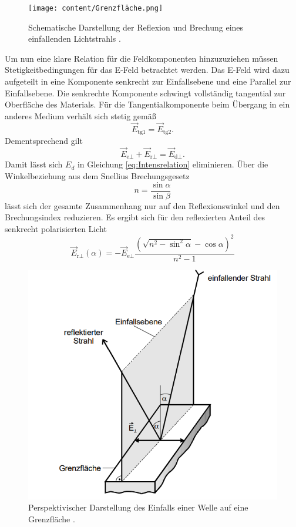 \begin{figure}[H]
    \centering
    \texttt{[image: content/Grenzfläche.png]}
    \caption{Schematische Darstellung der Reflexion und Brechung eines einfallenden Lichtstrahls \cite{sample}.}
    \label{fig:Grenz}
\end{figure}
Um nun eine klare Relation für die Feldkomponenten hinzuzuziehen müssen Stetigkeitbedingungen 
für das E-Feld betrachtet werden. Das E-Feld wird dazu aufgeteilt in eine Komponente senkrecht zur Einfallsebene und eine Parallel zur 
Einfallsebene. Die senkrechte Komponente schwingt vollständig tangential zur Oberfläche des Materials.
Für die Tangentialkomponente beim Übergang in ein anderes Medium verhält sich stetig gemäß
\begin{equation*}
    \vec{E}_\text{tg1}=\vec{E}_\text{tg2}.
\end{equation*}
Dementsprechend gilt
\begin{equation}
    \vec{E}_{\text{e}\perp}+ \vec{E}_{\text{r}\perp}= \vec{E}_{\text{d}\perp}.
    \label{eq:EsenkStet}
\end{equation}
Damit lässt sich $E_d$ in Gleichung \eqref{eq:Intensrelation} eliminieren. Über die Winkelbeziehung aus dem Snellius
Brechungsgesetz
\begin{equation}
    n=\frac{\sin{\alpha}}{\sin{\beta}}
    \label{eq:Snellius}
\end{equation}
lässt sich der gesamte Zusammenhang nur auf den Reflexionswinkel und den Brechungsindex reduzieren.  Es ergibt sich für den reflexierten Anteil des senkrecht polarisierten Licht
\begin{equation}
    \vec{E}_{\text{r}\perp}(\alpha)=-\vec{E}_{\text{e}\perp}\frac{\left(\sqrt{n^2-\sin^2{\alpha}}-\cos\alpha\right)^2}{n^2-1}
    \label{eq:Esenk}
\end{equation}
\begin{figure}[H]
    \centering
    \includegraphics[scale=1]{content/Einfallsebene.png}
    \caption{Perspektivischer Darstellung des Einfalls einer Welle auf eine Grenzfläche \cite{sample}.}
    \label{fig:Einfall}
\end{figure}
